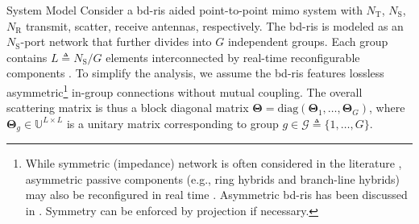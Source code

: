 \documentclass[journal]{IEEEtran}
\begin{document}
\begin{section}{System Model}
	Consider a \gls{bd}-\gls{ris} aided point-to-point \gls{mimo} system with $N_\mathrm{T}$, $N_\mathrm{S}$, $N_\mathrm{R}$ transmit, scatter, receive antennas, respectively.
	The \gls{bd}-\gls{ris} is modeled as an $N_\mathrm{S}$-port network \cite{Ivrlac2010} that further divides into $G$ independent groups.
	Each group contains $L \triangleq N_\mathrm{S} / G$ elements interconnected by real-time reconfigurable components \cite{Shen2020a}.
	To simplify the analysis, we assume the \gls{bd}-\gls{ris} features lossless asymmetric\footnote{While symmetric (impedance) network is often considered in the literature \cite{Shen2020a,Nerini2023,Santamaria2023,Fang2023,Nerini2023a,Zhou2023,Li2023d,Bartoli2023}, asymmetric passive components (e.g., ring hybrids and branch-line hybrids) may also be reconfigured in real time \cite{Ahn2006}. Asymmetric \gls{bd}-\gls{ris} has been discussed in \cite{Li2023b,Li2023c,Bartoli2023}. Symmetry can be enforced by projection \cite{Fang2023} if necessary.} in-group connections without mutual coupling.
	The overall scattering matrix is thus a block diagonal matrix $\mathbf{\Theta} = \mathrm{diag}(\mathbf{\Theta}_1,\ldots,\mathbf{\Theta}_G)$, where $\mathbf{\Theta}_g \in \mathbb{U}^{L \times L}$ is a unitary matrix corresponding to group $g \in \mathcal{G} \triangleq \{1,\ldots,G\}$.


\end{section}
\end{document}
